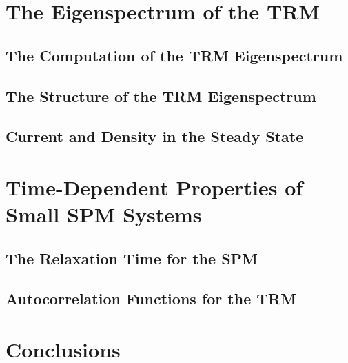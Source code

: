 \section{The Eigenspectrum of the TRM}

\subsection{The Computation of the TRM Eigenspectrum}

\subsection{The Structure of the TRM Eigenspectrum}

\subsection{Current and Density in the Steady State}

\section{Time-Dependent Properties of Small SPM Systems}

\subsection{The Relaxation Time for the SPM}

\subsection{Autocorrelation Functions for the TRM}

\section{Conclusions}
